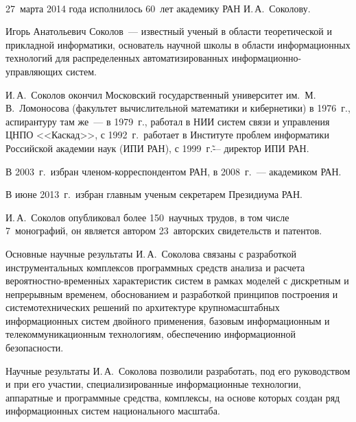       \begin{multicols}{2}

            \label{st\stat}

            \begin{center}
\mbox{%
\epsfxsize=78mm
}
\end{center}

\vspace*{18pt}




 27~марта 2014 года исполнилось 60~лет академику РАН И.\,А.~Соколову.

Игорь Анатольевич Соколов~--- известный ученый в области теоретической и
прикладной информатики, основатель научной школы в области информационных
технологий для распределенных\linebreak
 автоматизи\-рованных ин\-фор\-ма\-ци\-он\-но-управ\-ля\-ющих сис\-тем.

И.\,А.~Соколов окончил Московский государственный университет
им.\ М.\,В.~Ломоносова (факультет вычислительной математики и кибернетики) в
1976~г., аспирантуру там же~--- в 1979~г., работал в НИИ систем связи и
управления \mbox{ЦНПО} <<Каскад>>, с 1992~г.\ работает в Институте
проблем информатики
Российской академии наук (ИПИ РАН), с 1999~г.\~--- директор ИПИ РАН.

В 2003~г.\ избран членом-корреспондентом РАН, в 2008~г.~--- академиком РАН.

В июне 2013~г.\ избран главным ученым секретарем Президиума РАН.

И.\,А.~Соколов опубликовал более 150~научных трудов, в том числе 7~монографий, он является автором 23~авторских свидетельств и патентов.

Основные научные результаты И.\,А.~Соколова связаны с разработкой инструментальных комплексов программных средств анализа и расчета
вероятностно-временн$\acute{\mbox{ы}}$х характеристик систем в рамках моделей с дискретным и непрерывным временем, обоснованием и разработкой принципов построения и системотехнических решений по архитектуре крупномасштабных информационных систем двойного применения, базовым информационным и телекоммуникационным технологиям, обеспечению информационной безопасности.

Научные результаты И.\,А.~Соколова позволили разработать, под его руководством и при его участии, специализированные информационные технологии, аппаратные и программные средства, комплексы, на основе которых создан ряд информационных систем национального масштаба.


\end{multicols}
